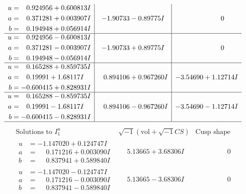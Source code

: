 \documentclass[1p]{elsarticle_modified}
\theoremstyle{definition}
\newcommand{\I}{\sqrt{-1}}
\begin{document}
$$\begin{array}{c|c|c}
\begin{aligned}
u &= \phantom{-}0.924956 + 0.600813 I \\
a &= \phantom{-}0.371281 + 0.003907 I \\
b &= \phantom{-}0.194948 + 0.056914 I\end{aligned}
 & -1.90733 - 0.89775 I & \phantom{-0.000000 } 0 \\ \hline\begin{aligned}
u &= \phantom{-}0.924956 - 0.600813 I \\
a &= \phantom{-}0.371281 - 0.003907 I \\
b &= \phantom{-}0.194948 - 0.056914 I\end{aligned}
 & -1.90733 + 0.89775 I & \phantom{-0.000000 } 0 \\ \hline\begin{aligned}
u &= \phantom{-}0.165288 + 0.859735 I \\
a &= \phantom{-}0.19991 + 1.68117 I \\
b &= -0.600415 + 0.828931 I\end{aligned}
 & \phantom{-}0.894106 + 0.967260 I & -3.54690 + 1.12714 I \\ \hline\begin{aligned}
u &= \phantom{-}0.165288 - 0.859735 I \\
a &= \phantom{-}0.19991 - 1.68117 I \\
b &= -0.600415 - 0.828931 I\end{aligned}
 & \phantom{-}0.894106 - 0.967260 I & -3.54690 - 1.12714 I\\
 \hline 
 \end{array}$$\newpage$$\begin{array}{c|c|c}  
\text{Solutions to }I^u_{1}& \I (\text{vol} + \sqrt{-1}CS) & \text{Cusp shape}\\
 \hline 
\begin{aligned}
u &= -1.147020 + 0.124747 I \\
a &= \phantom{-}0.171216 + 0.003090 I \\
b &= \phantom{-}0.837941 + 0.589840 I\end{aligned}
 & \phantom{-}5.13665 + 3.68306 I & \phantom{-0.000000 } 0 \\ \hline\begin{aligned}
u &= -1.147020 - 0.124747 I \\
a &= \phantom{-}0.171216 - 0.003090 I \\
b &= \phantom{-}0.837941 - 0.589840 I\end{aligned}
 & \phantom{-}5.13665 - 3.68306 I & \phantom{-0.000000 } 0 \\ \hline\begin{aligned}

\end{aligned}
\end{array}$$
\end{document}
